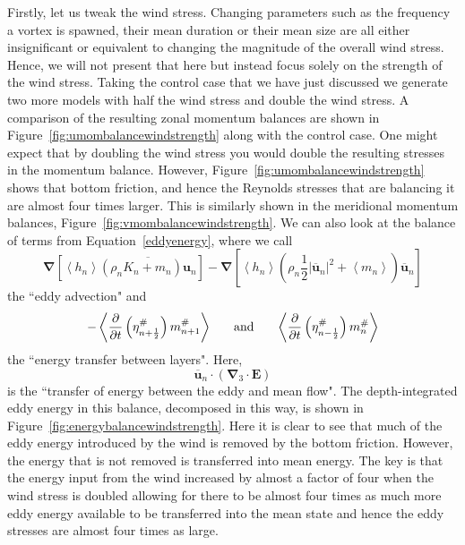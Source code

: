 \documentclass[12pt,a4paper]{report}
\newcommand*\thkmean[1]{\overline{#1}}
\newcommand*\nthkmean[1]{\left\langle{#1}\right\rangle}
\newcommand*\nthkres[1]{{#1}^{\#}}
\newcommand*\figref[1]{Figure~\ref{#1}}
\newcommand*\equref[1]{Equation~\eqref{#1}}
\newcommand*{\half}{\frac{1}{2}}
\begin{document}
 	Firstly, let us tweak the wind stress. Changing parameters such as the 
 	frequency a vortex is spawned, their mean duration or their mean size are all
 	either insignificant or equivalent to changing the magnitude of the overall
 	wind stress. Hence, we will not present that here but instead focus solely on the
 	strength of the wind stress. Taking the control case that we have just discussed
 	we generate two more models with half the wind stress and double the wind stress.
 	A comparison of the resulting zonal momentum balances are shown in \figref{fig:umombalancewindstrength} along with the control case. One might
 	expect that by doubling the wind stress you would double the resulting 
 	stresses in the momentum balance. However, \figref{fig:umombalancewindstrength}
 	shows that bottom friction, and hence the Reynolds stresses that are balancing it
 	are almost four times larger. This is similarly shown in the meridional momentum
 	balances, \figref{fig:vmombalancewindstrength}. We can also look at the balance
 	of terms from \equref{eddyenergy}, where we call
 	\begin{equation*}
 	\boldsymbol{\nabla} \left[\nthkmean{h_{n}} \thkmean{\left(\rho_{n}K_{n}+m_{n}\right) \boldsymbol{u}_{n}}\right] -\boldsymbol{\nabla} \left[\nthkmean{h_{n}} \left(\rho_{n}\half \left|\thkmean{\boldsymbol{u}}_{n}\right|^{2}+\nthkmean{m_{n}}\right) \thkmean{\boldsymbol{u}}_{n}\right]
 	\end{equation*}
 	the ``eddy advection" and
 	\begin{equation*}
 	- \nthkmean{\frac{\partial}{\partial t}\left(\nthkres{\eta}_{n+\half }\right)   \nthkres{m}_{n+1}}
 	\mbox{\hspace{5mm} and \hspace{5mm}} \nthkmean{\frac{\partial}{\partial t}\left(\nthkres{\eta}_{n-\half }\right) \nthkres{m}_{n}}
 	\end{equation*}
 	the ``energy transfer between layers". Here,
 	\begin{equation*}
 	\thkmean{\boldsymbol{u}}_{n} \cdot \left(\boldsymbol{\nabla}_{3}\cdot \boldsymbol{E}\right)
 	\end{equation*}
 	is the ``transfer of energy between the eddy and mean flow".
 	The depth-integrated eddy energy in this balance, decomposed in this way, is shown in
 	 \figref{fig:energybalancewindstrength}. Here it is
 	clear to see that much of the eddy energy introduced by the wind
 	is removed by the bottom friction. However, the energy that is not 
 	removed is transferred into mean energy. The key is that the energy
 	input from the wind increased by almost a factor of four when the wind
 	stress is doubled allowing for there to be
 	almost four times as much more eddy energy available to be transferred into the
 	mean state and hence the eddy stresses are  almost four times as large.
\end{document}
